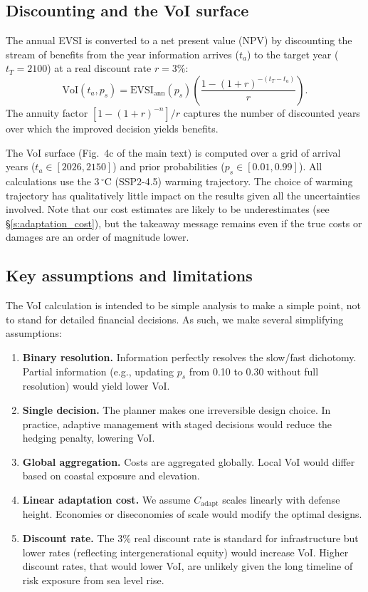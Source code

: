 \documentclass[12pt]{article}
\begin{document}
\subsection{Discounting and the VoI surface}

The annual EVSI is converted to a net present value (NPV) by discounting the stream of benefits from the year information arrives ($t_a$) to the target year ($t_T = 2100$) at a real discount rate $r = 3\%$:
\begin{equation}
\mathrm{VoI}(t_a, p_s) = \mathrm{EVSI}_{\mathrm{ann}}(p_s)\left( \frac{1 - (1+r)^{-(t_T - t_a)}}{r}\right).
\label{eq:voi}
\end{equation}
The annuity factor $[1 - (1+r)^{-n}]/r$ captures the number of discounted years over which the improved decision yields benefits.

The VoI surface (Fig.~4c of the main text) is computed over a grid of arrival years ($t_a \in [2026, 2150]$) and prior probabilities ($p_s \in [0.01, 0.99]$). All calculations use the 3$\,^\circ$C (SSP2-4.5) warming trajectory. The choice of warming trajectory has qualitatively little impact on the results given all the uncertainties involved. Note that our cost estimates are likely to be underestimates (see \S\ref{s:adaptation_cost}), but the takeaway message remains even if the true costs or damages are an order of magnitude lower. 

\subsection{Key assumptions and limitations}

The VoI calculation is intended to be simple analysis to make a simple point, not to stand for detailed financial decisions. As such, we make several simplifying assumptions:
\begin{enumerate}
\item \textbf{Binary resolution.} Information perfectly resolves the slow/fast dichotomy. Partial information (e.g., updating $p_s$ from 0.10 to 0.30 without full resolution) would yield lower VoI.
\item \textbf{Single decision.} The planner makes one irreversible design choice. In practice, adaptive management with staged decisions would reduce the hedging penalty, lowering VoI.
\item \textbf{Global aggregation.} Costs are aggregated globally. Local VoI would differ based on coastal exposure and elevation.
\item \textbf{Linear adaptation cost.} We assume $C_{\mathrm{adapt}}$ scales linearly with defense height. Economies or diseconomies of scale would modify the optimal designs.
\item \textbf{Discount rate.} The 3\% real discount rate is standard for infrastructure but lower rates (reflecting intergenerational equity) would increase VoI. Higher discount rates, that would lower VoI, are unlikely given the long timeline of risk exposure from sea level rise. 
\end{enumerate}
\end{document}
